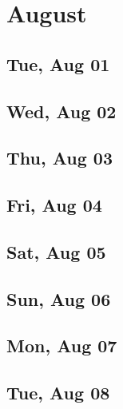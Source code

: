 \chapter{August}
	\section{Tue, Aug 01}
		
		
	\section{Wed, Aug 02}
		
		
	\section{Thu, Aug 03}
		
		
	\section{Fri, Aug 04}
		
		
	\section{Sat, Aug 05}
		
		
	\section{Sun, Aug 06}
		
		
	\section{Mon, Aug 07}
		
		
	\section{Tue, Aug 08}
		
		

